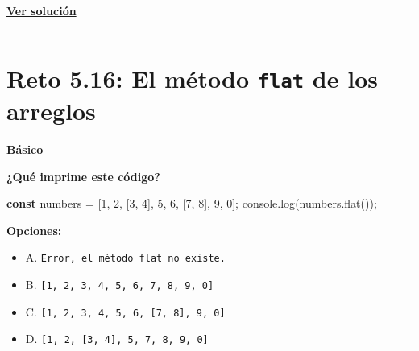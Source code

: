 \documentclass[
  letterpaper,
  DIV=11,
  numbers=noendperiod]{scrreprt}
\newenvironment{Shaded}{\begin{snugshade}}{\end{snugshade}}
\newcommand{\BuiltInTok}[1]{\textcolor[rgb]{0.00,0.23,0.31}{#1}}
\newcommand{\DecValTok}[1]{\textcolor[rgb]{0.68,0.00,0.00}{#1}}
\newcommand{\FunctionTok}[1]{\textcolor[rgb]{0.28,0.35,0.67}{#1}}
\newcommand{\KeywordTok}[1]{\textcolor[rgb]{0.00,0.23,0.31}{\textbf{#1}}}
\newcommand{\NormalTok}[1]{\textcolor[rgb]{0.00,0.23,0.31}{#1}}
\newcommand{\OperatorTok}[1]{\textcolor[rgb]{0.37,0.37,0.37}{#1}}
\providecommand{\tightlist}{%
  \setlength{\itemsep}{0pt}\setlength{\parskip}{0pt}}
\begin{document}
\textbf{\hyperref[sec-sol-cap5-reto15]{Ver solución}}

\begin{center}\rule{0.5\linewidth}{0.5pt}\end{center}

\section{\texorpdfstring{Reto 5.16: El método \texttt{flat} de los
arreglos}{Reto 5.16: El método flat de los arreglos}}\label{sec-cap5-reto16}

\begin{tcolorbox}[enhanced jigsaw, left=2mm, toprule=.15mm, leftrule=.75mm, breakable, colback=white, coltitle=black, bottomtitle=1mm, arc=.35mm, rightrule=.15mm, colframe=quarto-callout-caution-color-frame, opacitybacktitle=0.6, toptitle=1mm, opacityback=0, titlerule=0mm, title=\textcolor{quarto-callout-caution-color}{\faFire}\hspace{0.5em}{Dificultad}, bottomrule=.15mm, colbacktitle=quarto-callout-caution-color!10!white]

\textbf{Básico}

\end{tcolorbox}

\textbf{¿Qué imprime este código?}

\begin{Shaded}
\begin{Highlighting}[]
\KeywordTok{const}\NormalTok{ numbers }\OperatorTok{=}\NormalTok{ [}\DecValTok{1}\OperatorTok{,} \DecValTok{2}\OperatorTok{,}\NormalTok{ [}\DecValTok{3}\OperatorTok{,} \DecValTok{4}\NormalTok{]}\OperatorTok{,} \DecValTok{5}\OperatorTok{,} \DecValTok{6}\OperatorTok{,}\NormalTok{ [}\DecValTok{7}\OperatorTok{,} \DecValTok{8}\NormalTok{]}\OperatorTok{,} \DecValTok{9}\OperatorTok{,} \DecValTok{0}\NormalTok{]}\OperatorTok{;}
\BuiltInTok{console}\OperatorTok{.}\FunctionTok{log}\NormalTok{(numbers}\OperatorTok{.}\FunctionTok{flat}\NormalTok{())}\OperatorTok{;}
\end{Highlighting}
\end{Shaded}

\textbf{Opciones:}

\begin{itemize}
\tightlist
\item
  A. \texttt{Error,\ el\ método\ flat\ no\ existe.}
\item
  B. \texttt{{[}1,\ 2,\ 3,\ 4,\ 5,\ 6,\ 7,\ 8,\ 9,\ 0{]}}
\item
  C. \texttt{{[}1,\ 2,\ 3,\ 4,\ 5,\ 6,\ {[}7,\ 8{]},\ 9,\ 0{]}}
\item
  D. \texttt{{[}1,\ 2,\ {[}3,\ 4{]},\ 5,\ 7,\ 8,\ 9,\ 0{]}}
\end{itemize}
\end{document}
